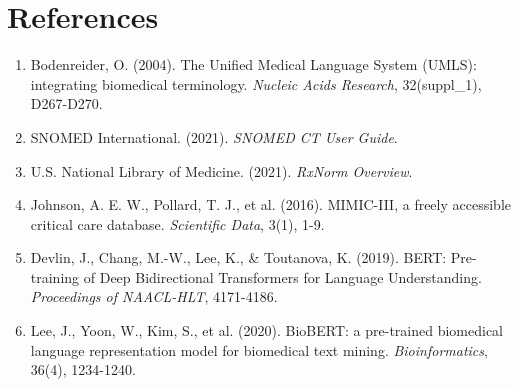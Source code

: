 \documentclass[12pt, a4paper]{article}
\begin{document}
\section*{References}

\begin{enumerate}
    \item Bodenreider, O. (2004). The Unified Medical Language System (UMLS): integrating biomedical terminology. \textit{Nucleic Acids Research}, 32(suppl\_1), D267-D270.
    \item SNOMED International. (2021). \textit{SNOMED CT User Guide}.
    \item U.S. National Library of Medicine. (2021). \textit{RxNorm Overview}.
    \item Johnson, A. E. W., Pollard, T. J., et al. (2016). MIMIC-III, a freely accessible critical care database. \textit{Scientific Data}, 3(1), 1-9.
    \item Devlin, J., Chang, M.-W., Lee, K., \& Toutanova, K. (2019). BERT: Pre-training of Deep Bidirectional Transformers for Language Understanding. \textit{Proceedings of NAACL-HLT}, 4171-4186.
    \item Lee, J., Yoon, W., Kim, S., et al. (2020). BioBERT: a pre-trained biomedical language representation model for biomedical text mining. \textit{Bioinformatics}, 36(4), 1234-1240.
\end{enumerate}
\end{document}
